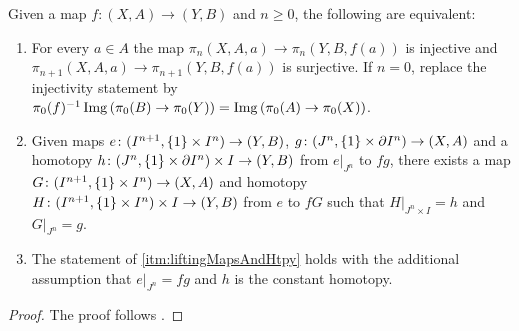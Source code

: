 \begin{prop}\label{prop:eqCharInjSurj}
    Given a map $f\colon(X,A)\to (Y,B)$ and $n\geq0$, the following are equivalent:
    \begin{enumerate}[label={(\roman*)}]
        \item For every $a\in A$ the map $\pi_n(X,A,a)\to \pi_n(Y,B,f(a))$ is injective and $\pi_{n+1}(X,A,a)\to \pi_{n+1}(Y,B,f(a))$ is surjective.
            If $n=0$, replace the injectivity statement by $\pi_0(f)^{-1}\operatorname{Img}\left(\pi_0(B)\to\pi_0(Y)\right)=\operatorname{Img}\left(\pi_0(A)\to\pi_0(X)\right)$. \label{itm:injAndSurjOfHtpyGrps}
        \item Given maps $e\colon(I^{n+1},\left\lbrace1\right\rbrace\times I^n)\to (Y,B)$, $g\colon(J^n,\left\lbrace1\right\rbrace\times\partial I^n)\to(X,A)$ and a homotopy $h\colon(J^n,\left\lbrace1\right\rbrace\times\partial I^n)\times I\to(Y,B)$ from $e|_{J^n}$ to $fg$, there exists a map $G\colon(I^{n+1},\left\lbrace1\right\rbrace\times I^n)\to(X,A)$ and homotopy $H\colon(I^{n+1},\left\lbrace1\right\rbrace\times I^n)\times I\to(Y,B)$ from $e$ to $fG$ such that $H|_{J^n\times I}=h$ and $G|_{J^n}=g$. \label{itm:liftingMapsAndHtpy} 
        \begin{center}
            \begin{adjustbox}{width=\linewidth}
            \end{adjustbox}        
        \end{center}
        \item The statement of \ref{itm:liftingMapsAndHtpy} holds with the additional assumption that $e|_{J^n}=fg$ and $h$ is the constant homotopy. \label{itm:liftingMapsAndHtpyConst}
    \end{enumerate}
    \begin{proof}
        The proof follows \cite[Lemma 3.3]{may1990weak}.


\end{proof}
\end{prop}
